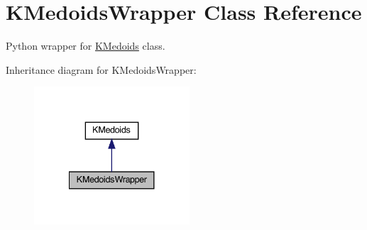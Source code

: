\hypertarget{classKMedoidsWrapper}{}\section{K\+Medoids\+Wrapper Class Reference}
\label{classKMedoidsWrapper}


Python wrapper for \hyperlink{classKMedoids}{K\+Medoids} class.  




Inheritance diagram for K\+Medoids\+Wrapper\+:\nopagebreak
\begin{figure}[H]
\begin{center}
\leavevmode
\includegraphics[width=164pt]{classKMedoidsWrapper__inherit__graph}
\end{center}
\end{figure}
